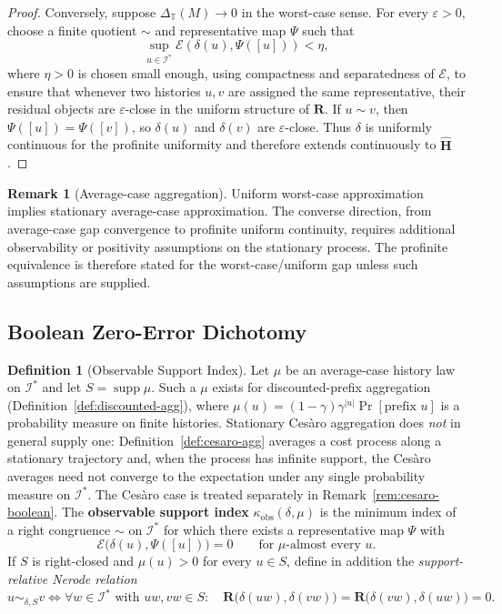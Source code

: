 \documentclass[12pt]{article}
\theoremstyle{definition}
\newtheorem{definition}[theorem]{Definition}
\newtheorem{remark}[theorem]{Remark}
\begin{document}
\begin{proof}
Conversely, suppose $\Delta_{\mathbb T}(M)\to0$ in the worst-case sense.  For
every $\varepsilon>0$, choose a finite quotient $\sim$ and representative map
$\Psi$ such that
\[
\sup_{u\in\mathcal I^*}
\mathcal E(\delta(u),\Psi([u]))
<
\eta,
\]
where $\eta>0$ is chosen small enough, using compactness and separatedness of
$\mathcal E$, to ensure that whenever two histories $u,v$ are assigned the same
representative, their residual objects are $\varepsilon$-close in the uniform
structure of $\mathbf R$.  If $u\sim v$, then $\Psi([u])=\Psi([v])$, so
$\delta(u)$ and $\delta(v)$ are $\varepsilon$-close.  Thus $\delta$ is
uniformly continuous for the profinite uniformity and therefore extends
continuously to $\widehat{\mathbf H}$.
\end{proof}

\begin{remark}[Average-case aggregation]
\label{rem:average-profinite}
Uniform worst-case approximation implies stationary average-case
approximation.  The converse direction, from average-case gap convergence to
profinite uniform continuity, requires additional observability or positivity
assumptions on the stationary process.  The profinite equivalence is therefore
stated for the worst-case/uniform gap unless such assumptions are supplied.
\end{remark}

\subsection{Boolean Zero-Error Dichotomy}
\label{subsec:meta-boolean}

\begin{definition}[Observable Support Index]
\label{def:observable-support-index}
Let $\mu$ be an average-case history law on $\mathcal I^*$ and let
$S=\operatorname{supp}\mu$.  Such a $\mu$ exists for discounted-prefix
aggregation (Definition~\ref{def:discounted-agg}), where
$\mu(u)=(1-\gamma)\gamma^{|u|}\Pr[\text{prefix }u]$ is a probability measure on
finite histories.  Stationary Ces\`aro aggregation does \emph{not} in general
supply one: Definition~\ref{def:cesaro-agg} averages a cost process along a
stationary trajectory and, when the process has infinite support, the Ces\`aro
averages need not converge to the expectation under any single probability
measure on $\mathcal I^*$.  The Ces\`aro case is treated separately in
Remark~\ref{rem:cesaro-boolean}.
The \textbf{observable support index} $\kappa_{\mathrm{obs}}(\delta,\mu)$ is
the minimum index of a right congruence $\sim$ on $\mathcal I^*$ for which
there exists a representative map $\Psi$ with
\[
\mathcal E\bigl(\delta(u),\Psi([u])\bigr)=0
\qquad
\text{for }\mu\text{-almost every }u .
\]
If $S$ is right-closed and $\mu(u)>0$ for every $u\in S$, define in addition
the \emph{support-relative Nerode relation}
\[
u\sim_{\delta,S}v
\iff
\forall w\in\mathcal I^*\text{ with }uw,vw\in S:\quad
\mathbf R\bigl(\delta(uw),\delta(vw)\bigr)
=
\mathbf R\bigl(\delta(vw),\delta(uw)\bigr)
=
0 .
\]
\end{definition}
\end{document}
